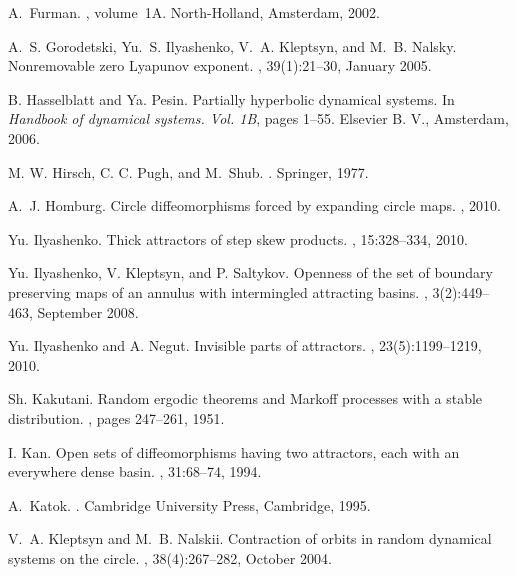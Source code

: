 \documentclass[a4paper,12pt]{amsart}
\begin{document}
\begin{thebibliography}{10}
A.~Furman.
, volume~1A.
\newblock North-Holland, Amsterdam, 2002.

A.~S. Gorodetski, Yu.~S. Ilyashenko, V.~A. Kleptsyn, and M.~B. Nalsky.
\newblock Nonremovable zero {L}yapunov exponent.
, 39(1):21--30, January
  2005.

B. Hasselblatt and Ya. Pesin.
\newblock Partially hyperbolic dynamical systems.
\newblock In {\em Handbook of dynamical systems. {V}ol. 1{B}}, pages 1--55.
  Elsevier B. V., Amsterdam, 2006.

M. W. Hirsch, C. C. Pugh, and M.~Shub.
.
\newblock Springer, 1977.

A.~J. Homburg.
\newblock Circle diffeomorphisms forced by expanding circle maps.
, 2010.

Yu. Ilyashenko.
\newblock Thick attractors of step skew products.
, 15:328--334, 2010.

Yu. Ilyashenko, V. Kleptsyn, and P. Saltykov.
\newblock Openness of the set of boundary preserving maps of an annulus with
  intermingled attracting basins.
, 3(2):449--463,
  September 2008.

Yu. Ilyashenko and A. Negut.
\newblock Invisible parts of attractors.
, 23(5):1199--1219, 2010.

Sh. Kakutani.
\newblock Random ergodic theorems and {M}arkoff processes with a stable
  distribution.
, pages 247--261, 1951.

I. Kan.
\newblock Open sets of diffeomorphisms having two attractors, each with an
  everywhere dense basin.
, 31:68--74, 1994.

A.~Katok.
.
\newblock Cambridge University Press, Cambridge, 1995.

V.~A. Kleptsyn and M.~B. Nalskii.
\newblock Contraction of orbits in random dynamical systems on the circle.
, 38(4):267--282,
  October 2004.


\end{thebibliography}
\end{document}
